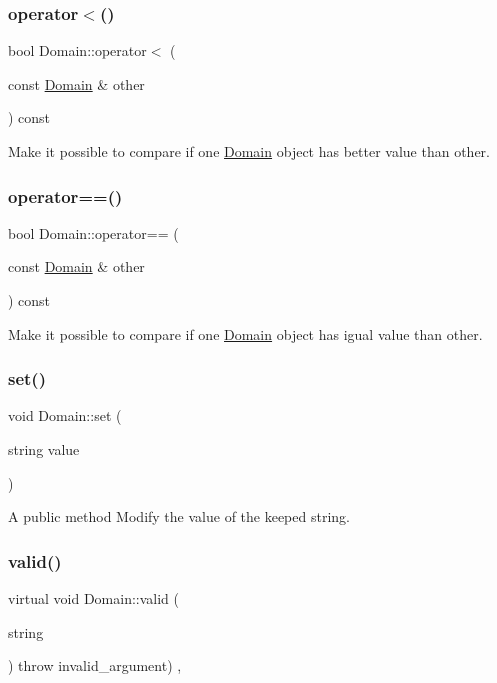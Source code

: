\subsubsection{\texorpdfstring{operator$<$()}{operator<()}}
{\footnotesize\ttfamily bool Domain\+::operator$<$ (\begin{DoxyParamCaption}\item[{const \hyperlink{class_domain}{Domain} \&}]{other }\end{DoxyParamCaption}) const}

Make it possible to compare if one \hyperlink{class_domain}{Domain} object has better value than other. \mbox{\label{class_domain_acd0015ed9d54a761f7fca726fa53b541}} 
\subsubsection{\texorpdfstring{operator==()}{operator==()}}
{\footnotesize\ttfamily bool Domain\+::operator== (\begin{DoxyParamCaption}\item[{const \hyperlink{class_domain}{Domain} \&}]{other }\end{DoxyParamCaption}) const}

Make it possible to compare if one \hyperlink{class_domain}{Domain} object has igual value than other. \mbox{\label{class_domain_a629126b8c9a6a749d30745bde230c4ee}} 
\subsubsection{\texorpdfstring{set()}{set()}}
{\footnotesize\ttfamily void Domain\+::set (\begin{DoxyParamCaption}\item[{string}]{value }\end{DoxyParamCaption})}

A public method Modify the value of the keeped string. \mbox{\label{class_domain_a6a4590a4c94ae7be6f4f0da9703fb6d6}} 
\subsubsection{\texorpdfstring{valid()}{valid()}}
{\footnotesize\ttfamily virtual void Domain\+::valid (\begin{DoxyParamCaption}\item[{string}]{ }\end{DoxyParamCaption}) throw  invalid\+\_\+argument) \hspace{0.3cm}{\ttfamily [protected]}, {}}

